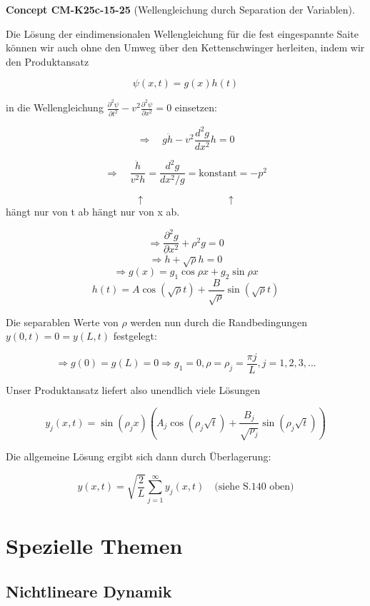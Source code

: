 \documentclass[10pt, letterpaper]{article}
\newcommand{\CustomHeading}[3]{%
  \par\medskip\noindent%
  \textbf{#1 #2} \textnormal{(#3)}.\enskip%
}
\newenvironment{CONC}[2]{\CustomHeading{Concept}{#1}{#2}}{}
\begin{document}
\begin{CONC}{CM-K25c-15-25}{Wellengleichung durch Separation der Variablen}
Die Lösung der eindimensionalen Wellengleichung für die fest eingespannte Saite können wir auch ohne den Umweg über den Kettenschwinger herleiten, indem wir den Produktansatz

\[\psi(x,t) = g(x)h(t)\]

in die Wellengleichung $\frac{\partial^2\psi}{\partial t^2} - v^2\frac{\partial^2\psi}{\partial x^2} = 0$ einsetzen:

\[\Rightarrow \quad g\ddot{h} - v^2\frac{d^2g}{dx^2}h = 0\]

\[\Rightarrow \quad \frac{\ddot{h}}{v^2h} = \frac{d^2g}{dx^2/g} = \text{konstant} = -p^2\]

\[\uparrow \qquad\qquad\qquad\qquad \uparrow\]
hängt nur von t ab \qquad hängt nur von x ab.

\[
\Rightarrow \frac{\partial^2 g}{\partial x^2} + \rho^2 g = 0
\]
\[
\Rightarrow \ddot{h} + \sqrt{\rho} h = 0
\]
\[
\Rightarrow g(x) = g_1 \cos \rho x + g_2 \sin \rho x
\]
\[
h(t) = A \cos(\sqrt{\rho}t) + \frac{B}{\sqrt{\rho}} \sin(\sqrt{\rho}t)
\]

Die separablen Werte von $\rho$ werden nun durch die Randbedingungen $y(0,t) = 0 = y(L,t)$ festgelegt:

\[
\Rightarrow g(0) = g(L) = 0 \Rightarrow g_1 = 0, \rho = \rho_j = \frac{\pi j}{L}, j=1,2,3,...
\]

Unser Produktansatz liefert also unendlich viele Lösungen

\[
y_j(x,t) = \sin(\rho_j x)\left(A_j \cos(\rho_j \sqrt{t}) + \frac{B_j}{\sqrt{\rho_j}} \sin(\rho_j \sqrt{t})\right)
\]

Die allgemeine Lösung ergibt sich dann durch Überlagerung:

\[
y(x,t) = \sqrt{\frac{2}{L}} \sum_{j=1}^{\infty} y_j(x,t) \quad \text{(siehe S.140 oben)}
\]
\end{CONC}

\section{Spezielle Themen}

\subsection{Nichtlineare Dynamik}
\end{document}
